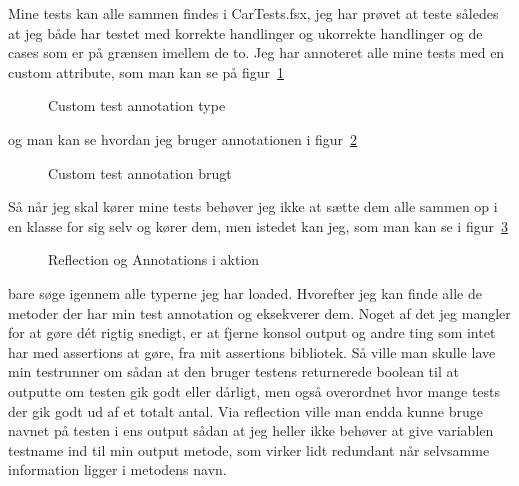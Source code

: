 Mine tests kan alle sammen findes i CarTests.fsx, jeg har prøvet at teste således at jeg både
har testet med korrekte handlinger og ukorrekte handlinger og de cases som
er på grænsen imellem de to.
Jeg har annoteret alle mine tests med en custom attribute, som man kan se på figur~\ref{fig:TestAnnotationAttribute}
\begin{figure}[!htb]
  \lstset{language=FSharp}
  \text{
    
  }
  \caption{Custom test annotation type}
\label{fig:TestAnnotationAttribute}
\end{figure}

og man kan se hvordan jeg bruger annotationen i figur~\ref{fig:AnnotationInAction}
\begin{figure}[!htb]
  \lstset{language=FSharp}
  \text{
    
  }
  \caption{Custom test annotation brugt}
\label{fig:AnnotationInAction}
\end{figure}

Så når jeg skal kører mine tests behøver jeg ikke at sætte dem alle sammen op i en klasse
for sig selv og kører dem, men istedet kan jeg, som man kan se i figur~\ref{fig:Reflection}
\begin{figure}[!htb]
  \lstset{language=FSharp}
  \text{
    
  }
  \caption{Reflection og Annotations i aktion}
\label{fig:Reflection}
\end{figure}
bare søge igennem alle typerne jeg har loaded. Hvorefter jeg kan finde alle de metoder der har min test annotation og eksekverer dem.
Noget af det jeg mangler for at gøre dét rigtig snedigt, er at fjerne konsol output og andre ting som intet har med assertions at gøre,
fra mit assertions bibliotek. Så ville man skulle lave min testrunner om sådan at den bruger testens returnerede boolean til at 
outputte om testen gik godt eller dårligt, men også overordnet hvor mange tests der gik godt ud af et totalt antal.
Via reflection ville man endda kunne bruge navnet på testen i ens output sådan at jeg heller ikke behøver 
at give variablen testname ind til min output metode, som virker lidt redundant når selvsamme information ligger i metodens navn.

